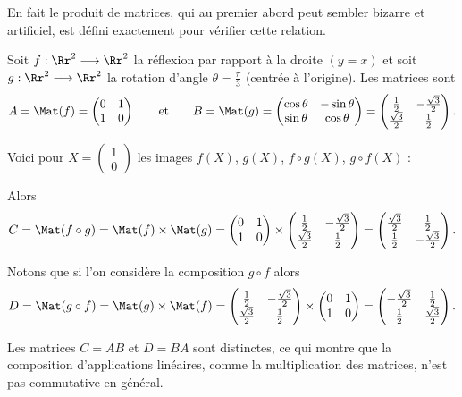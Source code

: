 \documentclass[class=report,crop=false]{standalone}
\begin{document}
En fait le produit de matrices, qui au premier abord peut sembler
bizarre et artificiel, est défini exactement pour vérifier cette relation.


\begin{exemple}
Soit $f: \Rr^2 \longrightarrow \Rr^2$ la réflexion par rapport à la droite
$(y = x)$ et soit $g: \Rr^2 \longrightarrow \Rr^2$
la rotation d'angle $\theta=\frac\pi3$ (centrée à l'origine).
Les matrices sont
$$ A = \Mat(f) = \begin{pmatrix} 0 & 1 \\ 1 & 0 \end{pmatrix}
\qquad \text{et} \qquad
B = \Mat(g) =
\begin{pmatrix}
\cos\theta & -\sin\theta\\
\sin\theta & \cos\theta
\end{pmatrix}
=
\begin{pmatrix}
\frac12 & -\frac{\sqrt3}{2} \\
\frac{\sqrt3}{2} & \frac12
\end{pmatrix}.
$$

Voici pour $X=\left(\begin{smallmatrix}1\\0\end{smallmatrix} \right)$ les images
$f(X)$, $g(X)$, $f\circ g(X)$, $g\circ f(X)$ :

Alors
$$C = \Mat (f\circ g)  = \Mat (f) \times \Mat (g) =
\begin{pmatrix} 0 & 1 \\ 1 & 0 \end{pmatrix} \times
\begin{pmatrix} \frac12 & -\frac{\sqrt3}{2} \\ \frac{\sqrt3}{2} & \frac12 \end{pmatrix}
= \begin{pmatrix} \frac{\sqrt3}{2} & \frac12  \\ \frac12 & -\frac{\sqrt3}{2}\end{pmatrix}.
$$

Notons que si l'on considère la composition $g\circ f$ alors
$$D = \Mat (g \circ f)  = \Mat (g) \times \Mat (f)
= \begin{pmatrix} \frac12 & -\frac{\sqrt3}{2} \\ \frac{\sqrt3}{2} & \frac12 \end{pmatrix}
 \times  \begin{pmatrix} 0 & 1 \\ 1 & 0 \end{pmatrix}
= \begin{pmatrix}-\frac{\sqrt3}{2} & \frac12 \\  \frac12 & \frac{\sqrt3}{2} \end{pmatrix}.
$$

Les matrices $C=AB$ et $D=BA$ sont distinctes, ce qui montre que la
composition d'applications linéaires, comme la multiplication des matrices,
n'est pas commutative en général.
\end{exemple}
\end{document}
